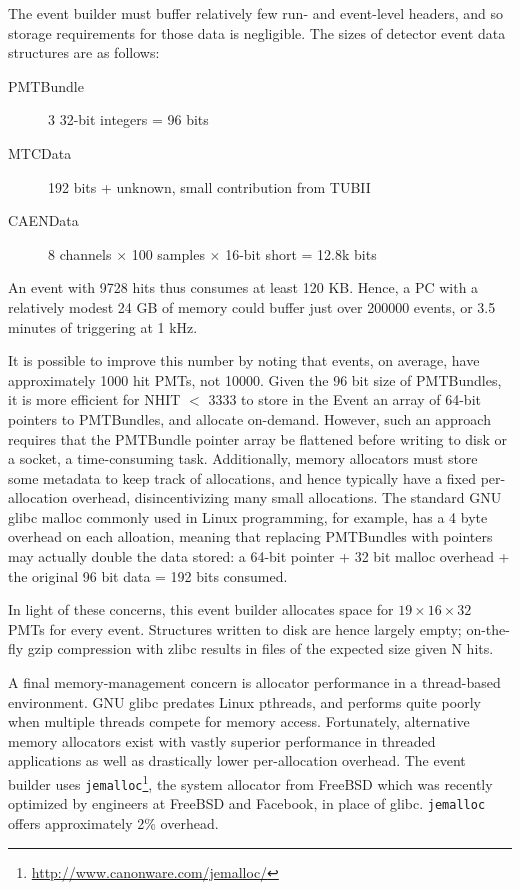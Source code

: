 \documentclass[11pt,twocolumn]{article}
\begin{document}
The event builder must buffer relatively few run- and event-level headers, and so storage requirements for those data is negligible. The sizes of detector event data structures are as follows:
\begin{description}
\item[PMTBundle] 3 32-bit integers = 96 bits
\item[MTCData] 192 bits + unknown, small contribution from TUBII
\item[CAENData] 8 channels $\times$ 100 samples $\times$ 16-bit short = 12.8k bits
\end{description}
An event with 9728 hits thus consumes at least 120 KB. Hence, a PC with a relatively modest 24 GB of memory could buffer just over 200000 events, or 3.5 minutes of triggering at 1 kHz.

It is possible to improve this number by noting that events, on average, have approximately 1000 hit PMTs, not 10000. Given the 96 bit size of PMTBundles, it is more efficient for NHIT $<$ 3333 to store in the Event an array of 64-bit pointers to PMTBundles, and allocate on-demand. However, such an approach requires that the PMTBundle pointer array be flattened before writing to disk or a socket, a time-consuming task. Additionally, memory allocators must store some metadata to keep track of allocations, and hence typically have a fixed per-allocation overhead, disincentivizing many small allocations. The standard GNU glibc malloc commonly used in Linux programming, for example, has a 4 byte overhead on each alloation, meaning that replacing PMTBundles with pointers may actually double the data stored: a 64-bit pointer + 32 bit malloc overhead + the original 96 bit data = 192 bits consumed.

In light of these concerns, this event builder allocates space for $19\times16\times32$ PMTs for every event. Structures written to disk are hence largely empty; on-the-fly gzip compression with zlibc results in files of the expected size given N hits.

A final memory-management concern is allocator performance in a thread-based environment. GNU glibc predates Linux pthreads, and performs quite poorly when multiple threads compete for memory access. Fortunately, alternative memory allocators exist with vastly superior performance in threaded applications as well as drastically lower per-allocation overhead. The event builder uses {\tt jemalloc}\footnote{\href{http://www.canonware.com/jemalloc/}{http://www.canonware.com/jemalloc/}}, the system allocator from FreeBSD which was recently optimized by engineers at FreeBSD and Facebook, in place of glibc. {\tt jemalloc} offers approximately 2\% overhead.
\end{document}

